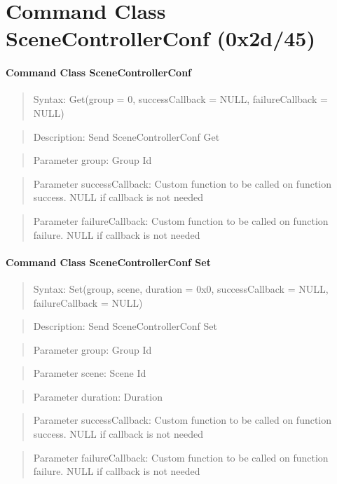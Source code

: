 \section{Command Class SceneControllerConf (0x2d/45)}

\paragraph {Command Class SceneControllerConf}
\begin{quote} Syntax: Get(group = 0, successCallback = NULL, failureCallback = NULL)\end{quote}
\begin{quote} Description: Send SceneControllerConf Get\end{quote}
\begin{quote} Parameter group: Group Id\end{quote}
\begin{quote} Parameter successCallback: Custom function to be called on function success. NULL if callback is not needed\end{quote}
\begin{quote} Parameter failureCallback: Custom function to be called on function failure. NULL if callback is not needed\end{quote}

\paragraph {Command Class SceneControllerConf Set}
\begin{quote} Syntax: Set(group, scene, duration = 0x0, successCallback = NULL, failureCallback = NULL)\end{quote}
\begin{quote} Description: Send SceneControllerConf Set\end{quote}
\begin{quote} Parameter group: Group Id\end{quote}
\begin{quote} Parameter scene: Scene Id\end{quote}
\begin{quote} Parameter duration: Duration\end{quote}
\begin{quote} Parameter successCallback: Custom function to be called on function success. NULL if callback is not needed\end{quote}
\begin{quote} Parameter failureCallback: Custom function to be called on function failure. NULL if callback is not needed\end{quote}

